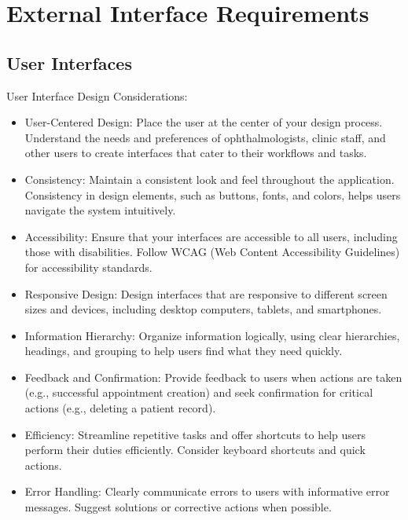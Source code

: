 \documentclass{scrreprt}
\begin{document}
	
	\chapter{External Interface Requirements}
	
	\section{User Interfaces}
	User Interface Design Considerations:
	\begin{itemize}
\item User-Centered Design: Place the user at the center of your design process. Understand the needs and preferences of ophthalmologists, clinic staff, and other users to create interfaces that cater to their workflows and tasks.
	 
\item	 Consistency: Maintain a consistent look and feel throughout the application. Consistency in design elements, such as buttons, fonts, and colors, helps users navigate the system intuitively.
	 
\item	 Accessibility: Ensure that your interfaces are accessible to all users, including those with disabilities. Follow WCAG (Web Content Accessibility Guidelines) for accessibility standards.
	 
\item	 Responsive Design: Design interfaces that are responsive to different screen sizes and devices, including desktop computers, tablets, and smartphones.
	 
\item	 Information Hierarchy: Organize information logically, using clear hierarchies, headings, and grouping to help users find what they need quickly.
	 
\item	 Feedback and Confirmation: Provide feedback to users when actions are taken (e.g., successful appointment creation) and seek confirmation for critical actions (e.g., deleting a patient record).
	 
\item	 Efficiency: Streamline repetitive tasks and offer shortcuts to help users perform their duties efficiently. Consider keyboard shortcuts and quick actions.
	 
\item	 Error Handling: Clearly communicate errors to users with informative error messages. Suggest solutions or corrective actions when possible.
	\end{itemize}
	 
\end{document}
